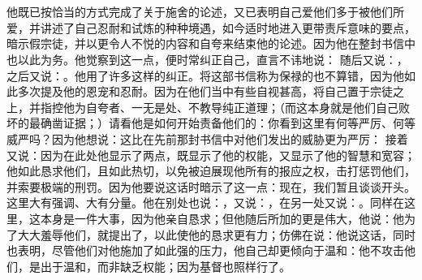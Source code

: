 
\section{}


\subsection{}

\par

他既已按恰当的方式完成了关于施舍的论述，又已表明自己爱他们多于被他们所爱，并讲述了自己忍耐和试炼的种种境遇，如今适时地进入更带责斥意味的要点，暗示假宗徒，并以更令人不悦的内容和自夸来结束他的论述。因为他在整封书信中也以此为务。他觉察到这一点，便时常纠正自己，直言不讳地说： 随后又说：，之后又说：。他用了许多这样的纠正。将这部书信称为保禄的也不算错，因为他如此多次提及他的恩宠和忍耐。因为在他们当中有些自视甚高，将自己置于宗徒之上，并指控他为自夸者、一无是处、不教导纯正道理；（而这本身就是他们自己败坏的最确凿证据；）请看他是如何开始责备他们的：你看到这里有何等严厉、何等威严吗？因为他想说：这比在先前那封书信中对他们发出的威胁更为严厉： 接着又说：因为在此处他显示了两点，既显示了他的权能，又显示了他的智慧和宽容；他如此恳求他们，且如此热切，以免被迫展现他所有的报应之权，击打惩罚他们，并索要极端的刑罚。因为他要说这话时暗示了这一点：现在，我们暂且谈谈开头。这里大有强调、大有分量。他在别处也说：，又说：，在另一处又说：。同样在这里，这本身是一件大事，因为他亲自恳求；但他随后所加的更是伟大，他说：他为了大大羞辱他们，就提出了，以此使他的恳求更有力；仿佛在说：他说这话，同时也表明，尽管他们对他施加了如此强的压力，他自己却更倾向于温和：他不攻击他们，是出于温和，而非缺乏权能；因为基督也照样行了。\par

